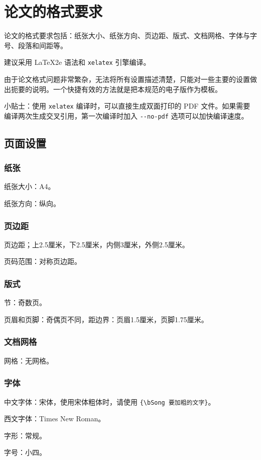 \chapter{论文的格式要求}
\label{chap:formats}
\par 论文的格式要求包括：纸张大小、纸张方向、页边距、版式、文档网格、字体与字号、段落和间距等\cite{机器学习}。
\par 建议采用 \LaTeX2e 语法和 \verb|xelatex| 引擎编译。
\par 由于论文格式问题非常繁杂，无法将所有设置描述清楚，只能对一些主要的设置做出扼要的说明。一个快捷有效的方法就是把本规范的电子版作为模板。
\par 小贴士：使用 \verb|xelatex| 编译时，可以直接生成双面打印的 PDF 文件。如果需要编译两次生成交叉引用，第一次编译时加入 \verb|--no-pdf| 选项可以加快编译速度。

\section{页面设置}
\subsection{纸张}
\par 纸张大小：A4。
\par 纸张方向：纵向。

\subsection{页边距}
\par 页边距；上2.5厘米，下2.5厘米，内侧3厘米，外侧2.5厘米。
\par 页码范围：对称页边距。

\subsection{版式}
\par 节：奇数页。
\par 页眉和页脚：奇偶页不同，距边界：页眉1.5厘米，页脚1.75厘米。

\subsection{文档网格}
\par 网格：无网格。

\subsection{字体}
\par 中文字体：宋体，使用{\bSong 宋体粗体}时，请使用 \verb|{\bSong 要加粗的文字}|。
\par 西文字体：Times New Roman。
\par 字形：常规。
\par 字号：小四。

